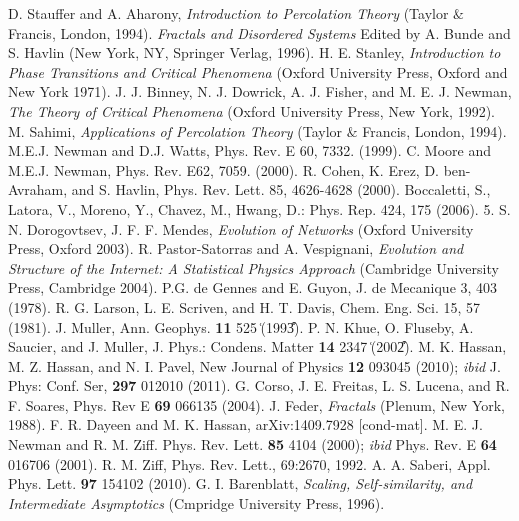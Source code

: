 ﻿\documentclass[twocolumn,showpacs,preprintnumbers,amsmath,amssymb]{revtex4}
\begin{document}
\begin{thebibliography}{99}
 D. Stauffer and A. Aharony, {\it Introduction to Percolation Theory} (Taylor $\&$ Francis, London, 1994).
 {\it Fractals and Disordered Systems} Edited by A. Bunde and S. Havlin  
(New York, NY, Springer Verlag, 1996).
 H. E. Stanley, {\it Introduction to Phase Transitions and Critical Phenomena} (Oxford University Press, Oxford and New York 1971).
 J.  J.  Binney,  N.  J.  Dowrick,  A.  J.  Fisher,  and  M.  E.  J.  Newman,  {\it The  Theory  of
Critical  Phenomena}  (Oxford University Press, New York, 1992).
 M. Sahimi, {\it Applications of Percolation Theory} (Taylor $\&$ Francis, London, 1994).
 M.E.J. Newman and D.J. Watts, Phys. Rev. E 60, 7332. (1999).
  C. Moore and M.E.J. Newman, Phys. Rev. E62, 7059. (2000).
 R. Cohen, K. Erez, D. ben-Avraham, and S. Havlin, Phys. Rev. Lett. 85, 4626-4628 (2000).
 Boccaletti, S., Latora, V., Moreno, Y., Chavez, M., Hwang, D.: Phys. Rep.
424, 175 (2006).
5. S. N. Dorogovtsev, J. F. F. Mendes, {\it Evolution of Networks} (Oxford University Press, Oxford 2003).
 R. Pastor-Satorras and A. Vespignani, {\it Evolution and Structure of the Internet: A Statistical Physics Approach} (Cambridge University Press, Cambridge 2004).
 P.G. de Gennes and E. Guyon, J. de Mecanique 3, 403 (1978).
 R. G. Larson, L. E. Scriven, and H. T. Davis, Chem. Eng. Sci. 15, 57 (1981).
 J. Muller, Ann. Geophys. {\bf 11} 525 ͑(1993͒).
 P. N. Khue, O. Fluseby, A. Saucier, and J. Muller, J. Phys.:
Condens. Matter {\bf 14} 2347 ͑(2002͒).
 M. K. Hassan, M. Z. Hassan, and N. I. Pavel, New Journal of Physics {\bf 12}  093045 (2010); {\it ibid} J. Phys: Conf. Ser, {\bf 297} 012010 (2011).
 G. Corso, J. E. Freitas, L. S. Lucena, and R. F. Soares, Phys. Rev E {\bf 69} 066135 (2004).
 J. Feder,  {\it Fractals} (Plenum, New York,  1988).
 F. R. Dayeen and M. K. Hassan, arXiv:1409.7928 [cond-mat].
 M. E. J. Newman  and R. M. Ziff. Phys. Rev. Lett. {\bf 85} 4104 (2000); {\it ibid} Phys. Rev. E {\bf 64} 016706 (2001).
 R. M. Ziff, Phys. Rev. Lett., 69:2670, 1992.
 A. A. Saberi, Appl. Phys. Lett. {\bf 97} 154102 (2010).
 G. I. Barenblatt, {\it Scaling, Self-similarity, and Intermediate Asymptotics} (Cmpridge University Press, 1996).






\end{thebibliography}
\end{document}
